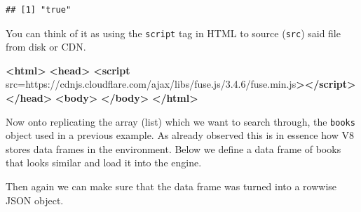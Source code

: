 \documentclass[
]{krantz}
\makeatletter
\newenvironment{Shaded}{\begin{snugshade}}{\end{snugshade}}
\newcommand{\DataTypeTok}[1]{\textcolor[rgb]{0.27,0.27,0.27}{#1}}
\newcommand{\KeywordTok}[1]{\textcolor[rgb]{0.27,0.27,0.27}{\textbf{#1}}}
\newcommand{\NormalTok}[1]{#1}
\newcommand{\OperatorTok}[1]{\textcolor[rgb]{0.43,0.43,0.43}{\textbf{#1}}}
\newcommand{\OtherTok}[1]{\textcolor[rgb]{0.37,0.37,0.37}{#1}}
\newcommand{\StringTok}[1]{\textcolor[rgb]{0.5,0.5,0.5}{#1}}
\newenvironment{kframe}{%
\medskip{}
\setlength{\fboxsep}{.8em}
 \def\at@end@of@kframe{}%
 \ifinner\ifhmode%
  \def\at@end@of@kframe{\end{minipage}}%
  \begin{minipage}{\columnwidth}%
 \fi\fi%
 \def\FrameCommand##1{\hskip\@totalleftmargin \hskip-\fboxsep
 \colorbox{shadecolor}{##1}\hskip-\fboxsep
     \hskip-\linewidth \hskip-\@totalleftmargin \hskip\columnwidth}%
 \MakeFramed {\advance\hsize-\width
   \@totalleftmargin\z@ \linewidth\hsize
   \@setminipage}}%
 {\par\unskip\endMakeFramed%
 \at@end@of@kframe}
\renewenvironment{Shaded}{\begin{kframe}}{\end{kframe}}
\makeatother
\begin{document}
\begin{verbatim}
## [1] "true"
\end{verbatim}

You can think of it as using the \texttt{script} tag in HTML to source (\texttt{src}) said file from disk or CDN.

\begin{Shaded}
\begin{Highlighting}[]
\KeywordTok{\textless{}html\textgreater{}}
  \KeywordTok{\textless{}head\textgreater{}}
    \KeywordTok{\textless{}script}\OtherTok{ src=}\StringTok{\textquotesingle{}https://cdnjs.cloudflare.com/ajax/libs/fuse.js/3.4.6/fuse.min.js\textquotesingle{}}\KeywordTok{\textgreater{}\textless{}/script\textgreater{}}
  \KeywordTok{\textless{}/head\textgreater{}}
  \KeywordTok{\textless{}body\textgreater{}}
  \KeywordTok{\textless{}/body\textgreater{}}
\KeywordTok{\textless{}/html\textgreater{}}
\end{Highlighting}
\end{Shaded}

Now onto replicating the array (list) which we want to search through, the \texttt{books} object used in a previous example. As already observed this is in essence how V8 stores data frames in the environment. Below we define a data frame of books that looks similar and load it into the engine.

\begin{Shaded}
\end{Shaded}

Then again we can make sure that the data frame was turned into a rowwise JSON object.

\begin{Shaded}
\end{Shaded}
\end{document}
